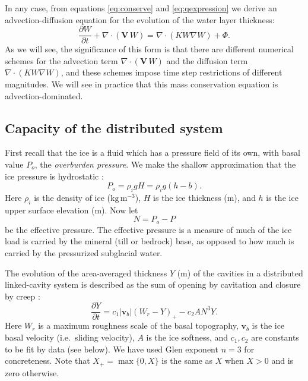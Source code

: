 \documentclass[11pt,final]{amsart}%
\newcommand\bv{\mathbf{v}}
\newcommand\bV{\mathbf{V}}
\newcommand{\Div}{\nabla\cdot}
\newcommand{\grad}{\nabla}
\begin{document}
In any case, from equations \eqref{eq:conserve} and \eqref{eq:qexpression} we derive an advection-diffusion equation \citep{HundsdorferVerwer2010} for the evolution of the water layer thickness:
\begin{equation} \label{eq:adeqn}
  \frac{\partial W}{\partial t} + \Div\left(\bV\, W\right) = \Div \left(K W \grad W\right) + \Phi.
\end{equation}
As we will see, the significance of this form is that there are different numerical schemes for the advection term $\Div\left(\bV\, W\right)$ and the diffusion term $\Div \left(K W \grad W\right)$, and these schemes impose time step restrictions of different magnitudes.  We will see in practice that this mass conservation equation is advection-dominated.

\subsection*{Capacity of the distributed system}  First recall that the ice is a fluid which has a pressure field of its own, with basal value $P_o$, the \emph{overburden pressure}.  We make the shallow approximation that the ice pressure is hydrostatic \citep{GreveBlatter2009}:
\begin{equation} \label{eq:hydrostatic}
  P_o = \rho_i g H = \rho_i g (h-b).
\end{equation}
Here $\rho_i$ is the density of ice ($\text{kg}\,\text{m}^{-3}$), $H$ is the ice thickness (m), and $h$ is the ice upper surface elevation (m).  Now let
\begin{equation}
N = P_o - P\label{eq:effective}
\end{equation}
be the effective pressure.  The effective pressure is a measure of much of the ice load is carried by the mineral (till or bedrock) base, as opposed to how much is carried by the pressurized subglacial water.

The evolution of the area-averaged thickness $Y$ (m) of the cavities in a distributed linked-cavity system \citep{Schoofetal2012} is described as the sum of opening by cavitation and closure by creep \citep{Hewitt2011}:
\begin{equation}
\frac{\partial Y}{\partial t} = c_1 |\bv_b| (W_r - Y)_+ - c_2 A N^3 Y. \label{eq:capacity}
\end{equation}
Here $W_r$ is a maximum roughness scale of the basal topography, $\bv_b$ is the ice basal velocity (i.e.~sliding velocity), $A$ is the ice softness, and $c_1,c_2$ are constants to be fit by data (see below).  We have used Glen exponent $n=3$ for concreteness.  Note that $X_+= \max\{0,X\}$ is the same as $X$ when $X>0$ and is zero otherwise.
\end{document}
